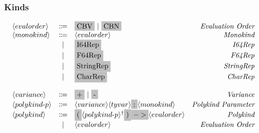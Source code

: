 \documentclass[11pt]{article}
\newcommand{\nonterminal}[1]{\langle #1 \rangle}
\newcommand{\terminal}[1]{\colorbox{lightgray}{\vphantom{X}#1}}
\newcommand{\commalist}[1]{#1^{\dagger}}
\begin{document}
\subsubsection{Kinds}
\[
  \begin{array}{lclr}
    \nonterminal{evalorder} & \Coloneqq & \terminal{CBV}\ |\ \terminal{CBN} & \emph{Evaluation Order} \\
    \nonterminal{monokind} & \Coloneqq & \nonterminal{evalorder} & \emph{Monokind} \\
    & | & \terminal{I64Rep} & \emph{I64Rep} \\
    & | & \terminal{F64Rep} & \emph{F64Rep} \\
    & | & \terminal{StringRep} & \emph{StringRep} \\
    & | & \terminal{CharRep} & \emph{CharRep} \\[4mm]
    \nonterminal{variance} & \Coloneqq & \terminal{+}\ |\ \terminal{-} & \emph{Variance} \\
    \nonterminal{polykind$-$p} & \Coloneqq & \nonterminal{variance}\nonterminal{tyvar} \terminal{:} \nonterminal{monokind} & \emph{Polykind Parameter} \\
    \nonterminal{polykind} & \Coloneqq & \terminal{(} \commalist{\nonterminal{polykind$-$p}}\terminal{)} \terminal{$->$} \nonterminal{evalorder} & \emph{Polykind} \\
    & | & \nonterminal{evalorder} & \emph{Evaluation Order}
  \end{array}
\]
\end{document}
